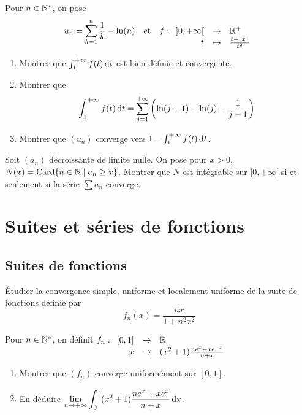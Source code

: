 \documentclass[12pt,a4paper]{exo_book}
\begin{document}
\begin{exo}
    Pour $n\in \mathbb{N}^*$, on pose
    \[u_n = \sum_{k=1}^n \frac{1}{k} - \ln (n) \quad \text{et} \quad f : \begin{array}[t]{rcl} ]0,+\infty[ & \to & \mathbb{R}^+ \\ t & \mapsto & \frac{t - \lfloor x \rfloor}{t^2} \end{array}\]

    \begin{enumerate}
        \item Montrer que $\int_1^{+\infty} f(t) {\rm \, d} t$ est bien définie et convergente.
        \item Montrer que
        \[\int_1^{+\infty} f(t) {\rm \, d} t = \sum_{j=1}^{+\infty} \left(\ln(j+1) - \ln(j) - \frac{1}{j+1}\right)\]
        \item Montrer que $(u_n)$ converge vers $1 - \int_1^{+\infty} f(t) {\rm \, d} t$.
    \end{enumerate}
\end{exo}

\begin{exo}
    Soit $(a_n)$ décroissante de limite nulle. On pose pour $x > 0$, $N(x) = \operatorname{Card}\{n \in \mathbb{N} \mid a_n \ge x\}$. Montrer que $N$ est intégrable sur $]0,+\infty[$ si et seulement si la série $\sum a_n$ converge.
\end{exo}

\chapter{Suites et séries de fonctions}

\section{Suites de fonctions}

\begin{exo}
    Étudier la convergence simple, uniforme et localement uniforme de la suite de fonctions définie par 
    \[f_n (x) = \frac{nx}{1+n^2 x^2}\]
\end{exo}

\begin{exo}
    Pour $n\in \mathbb{N}^*$, on définit $f_n : \begin{array}[t]{rcl} [0,1] & \to & \mathbb{R} \\ x & \mapsto & (x^2 + 1)\frac{ne^x + xe^{-x}}{n + x} \end{array}$
    \begin{enumerate}
        \item Montrer que $(f_n)$ converge uniformément sur $[0,1]$.
        \item En déduire $\displaystyle \lim_{n\to +\infty} \int_0^1 (x^2 + 1)\frac{ne^x + xe^x}{n+x} {\rm \, d} x$.
    \end{enumerate}
\end{exo}
\end{document}
